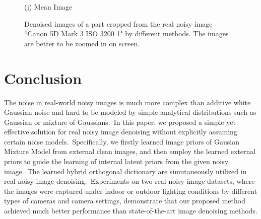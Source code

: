 \documentclass[10pt,twocolumn,letterpaper]{article}
\begin{document}
\begin{figure}
{\begin{minipage}[t]{0.195\textwidth}
{\footnotesize (j) Mean Image \cite{crosschannel2016}}
\end{minipage}
}\vspace{-1mm}
\caption{Denoised images of a part cropped from the real noisy image ``Canon 5D Mark 3 ISO 3200 1" by different methods. The images 
\vspace{-0.5mm}
are better to be zoomed in on screen.}
\vspace{-1mm}
\label{fig7}
\end{figure}


\section{Conclusion}

The noise in real-world noisy images is much more complex than additive white Gaussian noise and hard to be modeled by simple analytical distributions such as Gaussian or mixture of Gaussians.\ In this paper, we proposed a simple yet effective solution for real noisy image denoising without explicitly assuming certain noise models.\ Specifically, we firstly learned image priors of Gausian Mixture Model from external clean images, and then employ the learned external priors to guide the learning of internal latent priors from the given noisy image.\ The learned hybrid orthogonal dictionary are simutaneously utilized in real noisy image denoising.\ Experiments on two real noisy image datasets, where the images were captured under indoor or outdoor lighting conditions by different types of cameras and camera settings, demonstrate that our proposed method achieved much better performance than state-of-the-art image denoising methods.



{
\small


}
\end{document}
